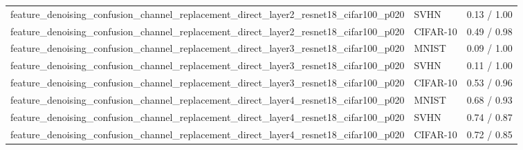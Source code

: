 \begin{tabular}{lll}
feature\_denoising\_confusion\_channel\_replacement\_direct\_layer2\_resnet18\_cifar100\_p020 & SVHN & 0.13 / 1.00 \\
feature\_denoising\_confusion\_channel\_replacement\_direct\_layer2\_resnet18\_cifar100\_p020 & CIFAR-10 & 0.49 / 0.98 \\
feature\_denoising\_confusion\_channel\_replacement\_direct\_layer3\_resnet18\_cifar100\_p020 & MNIST & 0.09 / 1.00 \\
feature\_denoising\_confusion\_channel\_replacement\_direct\_layer3\_resnet18\_cifar100\_p020 & SVHN & 0.11 / 1.00 \\
feature\_denoising\_confusion\_channel\_replacement\_direct\_layer3\_resnet18\_cifar100\_p020 & CIFAR-10 & 0.53 / 0.96 \\
feature\_denoising\_confusion\_channel\_replacement\_direct\_layer4\_resnet18\_cifar100\_p020 & MNIST & 0.68 / 0.93 \\
feature\_denoising\_confusion\_channel\_replacement\_direct\_layer4\_resnet18\_cifar100\_p020 & SVHN & 0.74 / 0.87 \\
feature\_denoising\_confusion\_channel\_replacement\_direct\_layer4\_resnet18\_cifar100\_p020 & CIFAR-10 & 0.72 / 0.85 \\
\bottomrule
\end{tabular}
